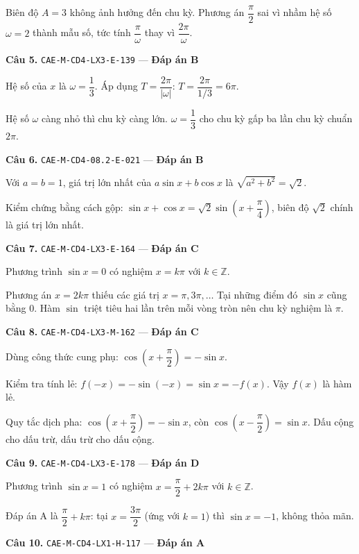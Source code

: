\documentclass[11pt, a4paper]{article}
\begin{document}
 Biên độ $A = 3$ không ảnh hưởng đến chu kỳ. Phương án $\dfrac{\pi}{2}$ sai vì nhầm hệ số $\omega = 2$ thành mẫu số, tức tính $\dfrac{\pi}{\omega}$ thay vì $\dfrac{2\pi}{\omega}$.

\textbf{Câu 5.} \texttt{CAE-M-CD4-LX3-E-139} — \textbf{Đáp án B}

Hệ số của $x$ là $\omega = \dfrac{1}{3}$. Áp dụng $T = \dfrac{2\pi}{|\omega|}$: $T = \dfrac{2\pi}{1/3} = 6\pi$.

 Hệ số $\omega$ càng nhỏ thì chu kỳ càng lớn. $\omega = \dfrac{1}{3}$ cho chu kỳ gấp ba lần chu kỳ chuẩn $2\pi$.

\textbf{Câu 6.} \texttt{CAE-M-CD4-08.2-E-021} — \textbf{Đáp án B}

Với $a = b = 1$, giá trị lớn nhất của $a\sin x + b\cos x$ là $\sqrt{a^2 + b^2} = \sqrt{2}$.

 Kiểm chứng bằng cách gộp: $\sin x + \cos x = \sqrt{2}\sin\left(x + \dfrac{\pi}{4}\right)$, biên độ $\sqrt{2}$ chính là giá trị lớn nhất.

\textbf{Câu 7.} \texttt{CAE-M-CD4-LX3-E-164} — \textbf{Đáp án C}

Phương trình $\sin x = 0$ có nghiệm $x = k\pi$ với $k \in \mathbb{Z}$.

 Phương án $x = 2k\pi$ thiếu các giá trị $x = \pi, 3\pi, \ldots$ Tại những điểm đó $\sin x$ cũng bằng $0$. Hàm $\sin$ triệt tiêu hai lần trên mỗi vòng tròn nên chu kỳ nghiệm là $\pi$.

\textbf{Câu 8.} \texttt{CAE-M-CD4-LX3-M-162} — \textbf{Đáp án C}

Dùng công thức cung phụ: $\cos\left(x + \dfrac{\pi}{2}\right) = -\sin x$.

Kiểm tra tính lẻ: $f(-x) = -\sin(-x) = \sin x = -f(x)$. Vậy $f(x)$ là hàm lẻ.

 Quy tắc dịch pha: $\cos\left(x + \dfrac{\pi}{2}\right) = -\sin x$, còn $\cos\left(x - \dfrac{\pi}{2}\right) = \sin x$. Dấu cộng cho dấu trừ, dấu trừ cho dấu cộng.

\textbf{Câu 9.} \texttt{CAE-M-CD4-LX3-E-178} — \textbf{Đáp án D}

Phương trình $\sin x = 1$ có nghiệm $x = \dfrac{\pi}{2} + 2k\pi$ với $k \in \mathbb{Z}$.

 Đáp án A là $\dfrac{\pi}{2} + k\pi$: tại $x = \dfrac{3\pi}{2}$ (ứng với $k = 1$) thì $\sin x = -1$, không thỏa mãn.

\textbf{Câu 10.} \texttt{CAE-M-CD4-LX1-H-117} — \textbf{Đáp án A}
\end{document}
